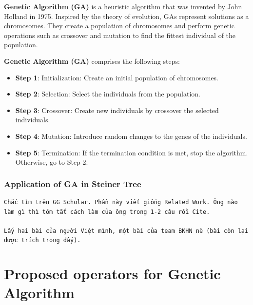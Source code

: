 \documentclass[runningheads]{llncs}
\begin{document}
\textbf{Genetic Algorithm (GA)} \cite{yu2010introduction}is a heuristic algorithm that was invented by John Holland in 1975.
Inspired by the theory of evolution, GAs represent solutions as a chromosomes.
They create a population of chromosomes and perform genetic operations such as crossover and mutation 
to find the fittest individual of the population.


\textbf{Genetic Algorithm (GA)} comprises the following steps:

\begin{itemize}
    \item \textbf{Step 1}: Initialization: Create an initial population of chromosomes.
    \item \textbf{Step 2}: Selection: Select the individuals from the population.
    \item \textbf{Step 3}: Crossover: Create new individuals by crossover the selected individuals.
    \item \textbf{Step 4}: Mutation: Introduce random changes to the genes of the individuals.
    \item \textbf{Step 5}: Termination: If the termination condition is met, stop the algorithm. Otherwise, go to Step 2.
\end{itemize}


\subsubsection{Application of GA in Steiner Tree}
\begin{verbatim}
Chắc tìm trên GG Scholar. Phần này viết giống Related Work. Ông nào làm gì thì tóm tắt cách làm của ông trong 1-2 câu rồi Cite.

Lấy hai bài của người Việt mình, một bài của team BKHN nè (bài còn lại được trích trong đấy).    
\end{verbatim}   


\section{Proposed operators for Genetic Algorithm} \label{genetic_algorithm_operators}
\end{document}
